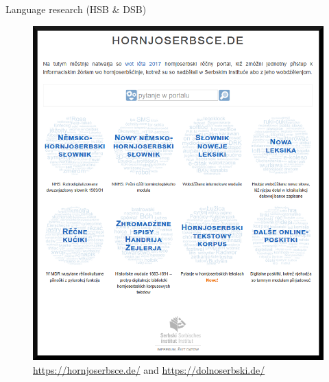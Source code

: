   \begin{block}{Language research (HSB \& DSB)}  


    \begin{figure}
        \centering
        \includegraphics[width=0.7\colwidth]{04_z_01_hornjoserbsce_gross_rand.png}
        \caption{\url{https://hornjoserbsce.de/} and \url{https://dolnoserbski.de/}}
        \label{fig:hornjoserbsce}
    \end{figure}


  \end{block}
